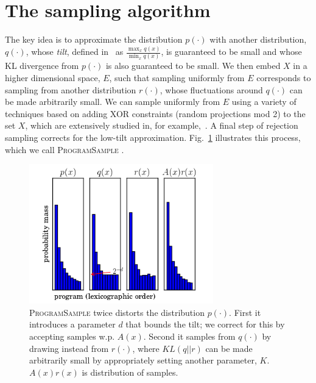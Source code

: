 \documentclass{article}
\newcommand{\theSystem}{\textsc{ProgramSample}}
\begin{document}
\section{The sampling algorithm}
The key idea is to approximate the distribution $p(\cdot )$ with another distribution, $q(\cdot )$, whose \emph{tilt}, defined in~\cite{chakraborty2014distribution} as $\frac{\max_x q(x)}{\min_x q(x)}$, is guaranteed to be small and whose KL divergence from $p(\cdot )$ is also guaranteed to be small.
We then embed $X$ in a higher dimensional space, $E$, such that sampling uniformly from $E$ corresponds to sampling from another distribution $r(\cdot)$, whose fluctuations around $q(\cdot )$ can be made arbitrarily small.
We can sample uniformly from $E$ using a variety of techniques based on adding XOR constraints (random projections mod 2) to the set $X$, which are extensively studied in, for example,~\cite{gomes2006near,valiant1985np,chakraborty2014balancing,gomes2006model}.
A final step of rejection sampling corrects for the low-tilt approximation.
Fig.~\ref{cartoon} illustrates this process, which we call \theSystem{} .
\begin{figure}
  \includegraphics[width=8cm]{cartoon.png}
  \caption{\theSystem{} twice distorts the distribution $p(\cdot )$. First it introduces a parameter $d$ that bounds the tilt; we correct for this by accepting samples w.p. $A(x)$. Second it samples from $q(\cdot )$ by drawing instead from $r(\cdot )$, where $KL(q||r)$ can be made arbitrarily small by appropriately setting another parameter, $K$. $A(x)r(x)$ is distribution of samples.}\label{cartoon}
  \end{figure}
\end{document}
